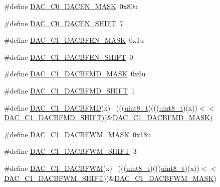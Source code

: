 \begin{DoxyCompactItemize}
\item 
\#define \hyperlink{group___d_a_c___register___masks_ga6865b52ae9a9275ef4db48eb3eb5d62a}{D\+A\+C\+\_\+\+C0\+\_\+\+D\+A\+C\+E\+N\+\_\+\+M\+A\+SK}~0x80u
\item 
\#define \hyperlink{group___d_a_c___register___masks_gae8835f0083d5a4e588402a32047e95cb}{D\+A\+C\+\_\+\+C0\+\_\+\+D\+A\+C\+E\+N\+\_\+\+S\+H\+I\+FT}~7
\item 
\#define \hyperlink{group___d_a_c___register___masks_ga61aa82d21d0c84ff4fe42d0856c506bd}{D\+A\+C\+\_\+\+C1\+\_\+\+D\+A\+C\+B\+F\+E\+N\+\_\+\+M\+A\+SK}~0x1u
\item 
\#define \hyperlink{group___d_a_c___register___masks_ga2062351429a9e737c0ac434488b59fe4}{D\+A\+C\+\_\+\+C1\+\_\+\+D\+A\+C\+B\+F\+E\+N\+\_\+\+S\+H\+I\+FT}~0
\item 
\#define \hyperlink{group___d_a_c___register___masks_ga28373e4d9ae322da4f6a37933a340b78}{D\+A\+C\+\_\+\+C1\+\_\+\+D\+A\+C\+B\+F\+M\+D\+\_\+\+M\+A\+SK}~0x6u
\item 
\#define \hyperlink{group___d_a_c___register___masks_ga779629844ed0967b310e7f2721c54624}{D\+A\+C\+\_\+\+C1\+\_\+\+D\+A\+C\+B\+F\+M\+D\+\_\+\+S\+H\+I\+FT}~1
\item 
\#define \hyperlink{group___d_a_c___register___masks_gaacd61446351eecf90f0c04eed83ef08f}{D\+A\+C\+\_\+\+C1\+\_\+\+D\+A\+C\+B\+F\+MD}(x)                                            ~(((\hyperlink{_p_e___types_8h_aba7bc1797add20fe3efdf37ced1182c5}{uint8\+\_\+t})(((\hyperlink{_p_e___types_8h_aba7bc1797add20fe3efdf37ced1182c5}{uint8\+\_\+t})(x))$<$$<$\hyperlink{group___d_a_c___register___masks_ga779629844ed0967b310e7f2721c54624}{D\+A\+C\+\_\+\+C1\+\_\+\+D\+A\+C\+B\+F\+M\+D\+\_\+\+S\+H\+I\+FT}))\&\hyperlink{group___d_a_c___register___masks_ga28373e4d9ae322da4f6a37933a340b78}{D\+A\+C\+\_\+\+C1\+\_\+\+D\+A\+C\+B\+F\+M\+D\+\_\+\+M\+A\+SK})
\item 
\#define \hyperlink{group___d_a_c___register___masks_gaad89dbfc60735cf12eb6cfff9157fffa}{D\+A\+C\+\_\+\+C1\+\_\+\+D\+A\+C\+B\+F\+W\+M\+\_\+\+M\+A\+SK}~0x18u
\item 
\#define \hyperlink{group___d_a_c___register___masks_gacc4542331c55b93fe589d439a69122f7}{D\+A\+C\+\_\+\+C1\+\_\+\+D\+A\+C\+B\+F\+W\+M\+\_\+\+S\+H\+I\+FT}~3
\item 
\#define \hyperlink{group___d_a_c___register___masks_ga4a605c96af86b2bcbb448a075e1fb76e}{D\+A\+C\+\_\+\+C1\+\_\+\+D\+A\+C\+B\+F\+WM}(x)                                            ~(((\hyperlink{_p_e___types_8h_aba7bc1797add20fe3efdf37ced1182c5}{uint8\+\_\+t})(((\hyperlink{_p_e___types_8h_aba7bc1797add20fe3efdf37ced1182c5}{uint8\+\_\+t})(x))$<$$<$\hyperlink{group___d_a_c___register___masks_gacc4542331c55b93fe589d439a69122f7}{D\+A\+C\+\_\+\+C1\+\_\+\+D\+A\+C\+B\+F\+W\+M\+\_\+\+S\+H\+I\+FT}))\&\hyperlink{group___d_a_c___register___masks_gaad89dbfc60735cf12eb6cfff9157fffa}{D\+A\+C\+\_\+\+C1\+\_\+\+D\+A\+C\+B\+F\+W\+M\+\_\+\+M\+A\+SK})

\end{DoxyCompactItemize}
